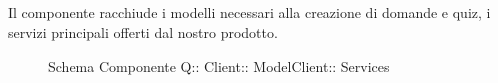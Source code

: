 \subsection{}
Il componente racchiude i modelli necessari alla creazione di domande e quiz, i servizi principali offerti dal nostro prodotto.
\begin{figure}[H]
\centering
\noindent{}
\caption[Schema Componente Quizzipedia::Client::ModelClient::Services]{Schema Componente Q:: Client:: ModelClient:: Services}
\end{figure}
